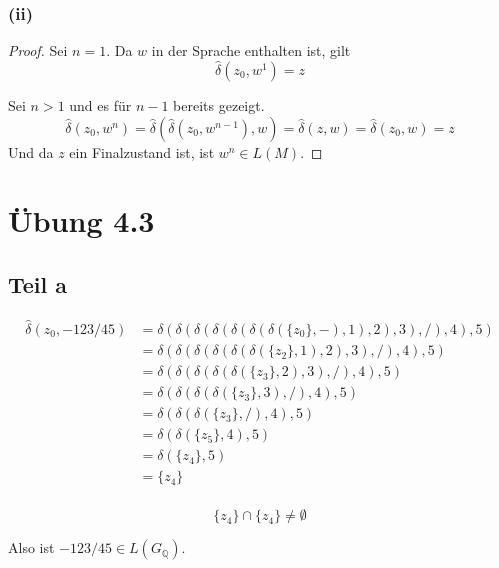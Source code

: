 \documentclass[10pt,a4paper]{article}
\begin{document}
\subsubsection{(ii)}

\begin{proof}
  Sei $n = 1$.
  Da $w$ in der Sprache enthalten ist, gilt
  \begin{equation}
    \hat{\delta}(z_{0}, w^{1}) = z
  \end{equation}

  Sei $n > 1$ und es für $n - 1$ bereits gezeigt.
  \begin{equation}
    \hat{\delta}(z_{0}, w^{n}) = \hat{\delta}(\hat{\delta}(z_{0}, w^{n - 1}), w) = \hat{\delta}(z, w) = \hat{\delta}(z_{0}, w) = z
  \end{equation}
  Und da $z$ ein Finalzustand ist, ist $w^{n} \in L(M)$.
\end{proof}

\section{Übung 4.3}

\subsection{Teil a}

\begin{align*}
  \hat{\delta}(z_{0}, -123/45) & = \delta(\delta(\delta(\delta(\delta(\delta(\delta(\{z_{0}\}, -), 1), 2), 3), /), 4), 5)\\
  & = \delta(\delta(\delta(\delta(\delta(\delta(\{ z_{2} \}, 1), 2), 3), /), 4), 5)\\
  & = \delta(\delta(\delta(\delta(\delta(\{ z_{3} \}, 2), 3), /), 4), 5)\\
  & = \delta(\delta(\delta(\delta(\{ z_{3} \}, 3), /), 4), 5)\\
  & = \delta(\delta(\delta(\{ z_{3} \}, /), 4), 5)\\
  & = \delta(\delta(\{ z_{5} \}, 4), 5)\\
  & = \delta(\{ z_{4} \}, 5)\\
  & = \{ z_{4} \}\\
\end{align*}

\begin{equation}
  \{ z_{4} \} \cap \{ z_{4} \} \ne \emptyset
\end{equation}

Also ist $-123/45 \in L(G_{\mathbb{Q}})$.
\end{document}
